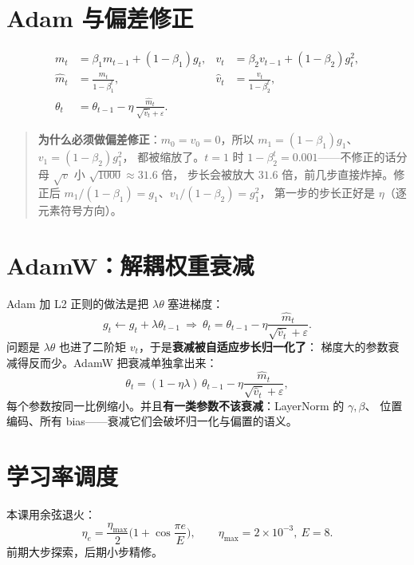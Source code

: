 \section{Adam 与偏差修正}

\begin{align}
  m_t&=\beta_1m_{t-1}+(1-\beta_1)g_t, &
  v_t&=\beta_2v_{t-1}+(1-\beta_2)g_t^2,\\
  \hat m_t&=\frac{m_t}{1-\beta_1^t}, &
  \hat v_t&=\frac{v_t}{1-\beta_2^t},\\
  \theta_t&=\theta_{t-1}-\eta\,\frac{\hat m_t}{\sqrt{\hat v_t}+\varepsilon}. &&
\end{align}

\begin{quote}
\textbf{为什么必须做偏差修正}：$m_0=v_0=0$，所以 $m_1=(1-\beta_1)g_1$、$v_1=(1-\beta_2)g_1^2$，
都被缩放了。$t=1$ 时 $1-\beta_2^t=0.001$——不修正的话分母 $\sqrt{v}$ 小 $\sqrt{1000}\approx31.6$ 倍，
步长会被放大 $31.6$ 倍，前几步直接炸掉。修正后 $m_1/(1-\beta_1)=g_1$、$v_1/(1-\beta_2)=g_1^2$，
第一步的步长正好是 $\eta$（逐元素符号方向）。
\end{quote}

\section{AdamW：解耦权重衰减}

Adam 加 L2 正则的做法是把 $\lambda\theta$ 塞进梯度：
\begin{equation}
  g_t\leftarrow g_t+\lambda\theta_{t-1}
  \ \Rightarrow\ \theta_t=\theta_{t-1}-\eta\frac{\hat m_t}{\sqrt{\hat v_t}+\varepsilon}.
\end{equation}
问题是 $\lambda\theta$ 也进了二阶矩 $v_t$，于是\textbf{衰减被自适应步长归一化了}：
梯度大的参数衰减得反而少。AdamW 把衰减单独拿出来：
\begin{equation}
  \theta_t=(1-\eta\lambda)\,\theta_{t-1}-\eta\frac{\hat m_t}{\sqrt{\hat v_t}+\varepsilon},
\end{equation}
每个参数按同一比例缩小。并且\textbf{有一类参数不该衰减}：LayerNorm 的 $\gamma,\beta$、
位置编码、所有 bias——衰减它们会破坏归一化与偏置的语义。

\section{学习率调度}

本课用余弦退火：
\begin{equation}
  \eta_e=\frac{\eta_{\max}}{2}\Big(1+\cos\frac{\pi e}{E}\Big),
  \qquad \eta_{\max}=2\times10^{-3},\ E=8 .
\end{equation}
前期大步探索，后期小步精修。

